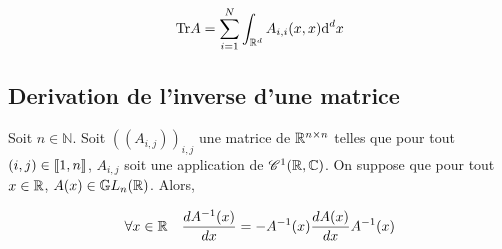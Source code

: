 \documentclass[10pt]{article}
\begin{document}
\begin{multicols}{2}
\begin{equation}
  \text{Tr} A = \sum_{i=1}^{N} \int_{\mathbb{R}^d} A_{i,i}(x,x) \text{d}^d x 
\end{equation}





\subsection{Derivation de l'inverse d'une matrice}

Soit $ n \in \mathbb{N}$. Soit $((A_{i,j}))_{i,j}$ une matrice de $\mathbb{R}^{n \times n}$ telles que pour tout $(i,j) \in  \llbracket 1,n \rrbracket $, $A_{i,j}$ soit une application de $\mathscr{C}^1(\mathbb{R},\mathbb{C}) $. On suppose que pour tout $x \in \mathbb{R}$, $A(x) \in  \mathbb{G}L_n(\mathbb{R})$. Alors, 

\begin{equation}
  \forall x \in \mathbb{R} \quad \frac{dA^{-1}(x)}{dx} = - A^{-1}(x) \frac{dA(x)}{dx}A^{-1}(x)
\end{equation} 

\end{multicols}
\end{document}
